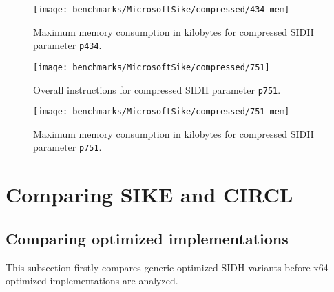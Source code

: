 \begin{figure}[H]
  \centering
  \texttt{[image: benchmarks/MicrosoftSike/compressed/434\_mem]}
  \caption[Maximum memory consumption compressed p434]
  {Maximum memory consumption in kilobytes for compressed \gls{SIDH} parameter \texttt{p434}.}
  \label{fig:results_comp_434_mem}
\end{figure}

\begin{figure}[H]
  \centering
  \texttt{[image: benchmarks/MicrosoftSike/compressed/751]}
  \caption[Overall instructions compressed p751]
  {Overall instructions for compressed \gls{SIDH} parameter \texttt{p751}.}
  \label{fig:results_comp_751}
\end{figure}

\begin{figure}[H]
  \centering
  \texttt{[image: benchmarks/MicrosoftSike/compressed/751\_mem]}
  \caption[Maximum memory consumption compressed p751]
  {Maximum memory consumption in kilobytes for compressed \gls{SIDH} parameter \texttt{p751}.}
  \label{fig:results_comp_751_mem}
\end{figure}

\section{Comparing \gls{SIKE} and \gls{CIRCL}} \label{sec:sike_vs_circl}


\subsection{Comparing optimized implementations}\label{sec:analysis_optimized}
This subsection firstly compares generic optimized \gls{SIDH} variants before x64 optimized implementations are analyzed.

